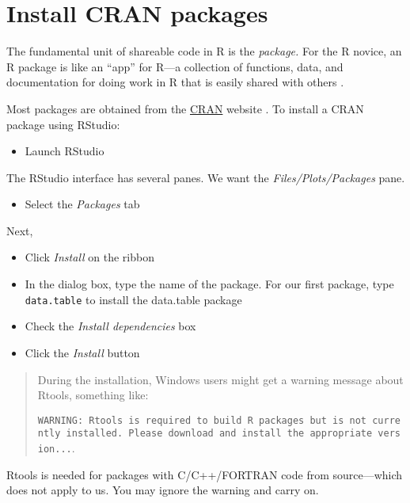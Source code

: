 \documentclass[
]{book}
\providecommand{\tightlist}{%
  \setlength{\itemsep}{0pt}\setlength{\parskip}{0pt}}
\begin{document}
\hypertarget{install-cran-packages}{%
\section{Install CRAN packages}\label{install-cran-packages}}

The fundamental unit of shareable code in R is the \emph{package.} For the R novice, an R package is like an ``app'' for R---a collection of functions, data, and documentation for doing work in R that is easily shared with others \citep{wickham2014advanced}.

Most packages are obtained from the \href{https://cran.r-project.org/}{CRAN} website \citep{cranweb}. To install a CRAN package using RStudio:

\begin{itemize}
\tightlist
\item
  Launch RStudio
\end{itemize}

The RStudio interface has several panes. We want the \emph{Files/Plots/Packages} pane.

\begin{itemize}
\tightlist
\item
  Select the \emph{Packages} tab
\end{itemize}

Next,

\begin{itemize}
\tightlist
\item
  Click \emph{Install} on the ribbon
\item
  In the dialog box, type the name of the package. For our first package, type \texttt{data.table} to install the data.table package \citep{R-data.table}
\item
  Check the \emph{Install dependencies} box
\item
  Click the \emph{Install} button
\end{itemize}

\begin{quote}
During the installation, Windows users might get a warning message about
Rtools, something like:

\texttt{WARNING:\ Rtools\ is\ required\ to\ build\ R\ packages\ but\ is\ not\ currently\ installed.\ Please\ download\ and\ install\ the\ appropriate\ version...}.
\end{quote}

Rtools is needed for packages with C/C++/FORTRAN code from source---which does not apply to us. You may ignore the warning and carry on.
\end{document}
